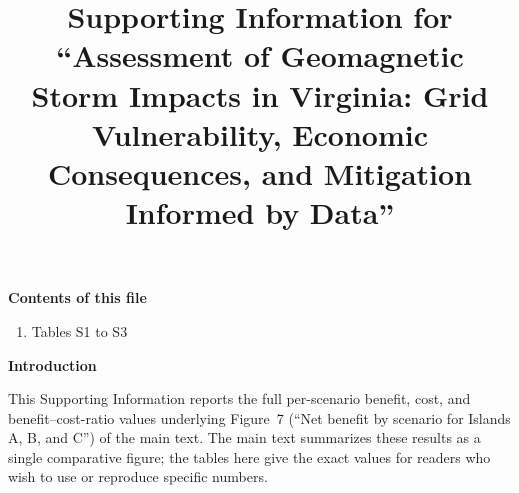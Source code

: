 \documentclass[draft]{agutexSI2019}
\begin{document}
\title{Supporting Information for ``Assessment of Geomagnetic Storm Impacts in Virginia: Grid Vulnerability, Economic Consequences, and Mitigation Informed by Data''}


\noindent\textbf{Contents of this file}
\begin{enumerate}
\item Tables S1 to S3
\end{enumerate}

\noindent\textbf{Introduction}

This Supporting Information reports the full per-scenario benefit, cost, and
benefit--cost-ratio values underlying Figure~7 (``Net benefit by scenario for
Islands A, B, and C'') of the main text. The main text summarizes these
results as a single comparative figure; the tables here give the exact
values for readers who wish to use or reproduce specific numbers.

\end{document}
